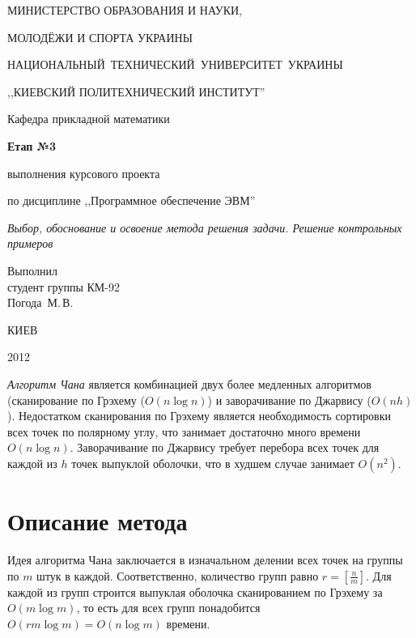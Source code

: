\documentclass[a4paper,12pt,notitlepage,headsepline,pdftex]{scrreprt}
\begin{document}
\begin{titlepage}
  \begin{center}
    \large
    \MakeUppercase{Министерство образования и науки,}

    \MakeUppercase{молодёжи и спорта Украины}

    \mbox{\MakeUppercase{Национальный технический университет Украины}}

    \MakeUppercase{,,Киевский политехнический институт''}

    \addvspace{6pt}

    \normalsize
    Кафедра прикладной математики

    \vfill

    \textbf{Етап №3}

    выполнения курсового проекта

    по дисциплине ,,Программное обеспечение ЭВМ''

    \emph{Выбор, обоснование и освоение метода решения задачи.
          Решение контрольных примеров}
  \end{center}

  \vfill

  \noindent
  Выполнил\\
  студент группы КМ-92\\
  Погода~М.\,В.\\
  \vfill

  \begin{center}
    КИЕВ

    2012
  \end{center}
\end{titlepage}

\emph{Алгоритм Чана} является комбинацией двух более медленных алгоритмов
(сканирование по Грэхему ($O(n\log n)$) и заворачивание по Джарвису ($O(n h)$).
Недостатком сканирования по Грэхему является необходимость сортировки всех
точек по полярному углу, что занимает достаточно много времени $O(n\log n)$.
Заворачивание по Джарвису требует перебора всех точек для каждой из $h$ точек
выпуклой оболочки, что в худшем случае занимает $O(n^2)$.

\section*{Описание метода}
  Идея алгоритма Чана заключается в изначальном делении всех точек на группы
  по $m$ штук в каждой.
  Соответственно, количество групп равно $\displaystyle r = \left[\frac{n}{m}\right]$.
  Для каждой из групп строится выпуклая оболочка сканированием по Грэхему за
  $O(m\log m)$, то есть для всех групп понадобится $O(rm\log m) = O(n\log m)$
  времени.
\end{document}
